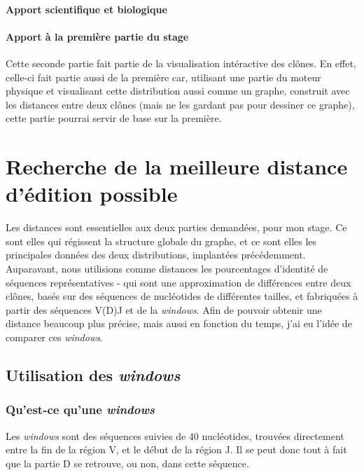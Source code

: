\documentclass[12pt]{report}
\begin{document}
\begin{spacing}{1.2}
\subsubsection{Apport scientifique et biologique}

\subsubsection{Apport à la première partie du stage}

Cette seconde partie fait partie de la visualisation intéractive des clônes.
\newline
En effet, celle-ci fait partie aussi de la première car, utilisant une partie du moteur physique et visualisant cette distribution aussi comme un graphe, construit avec les distances entre deux clônes (mais ne les gardant pas pour dessiner ce graphe), cette partie pourrai servir de base sur la première.

\chapter{Recherche de la meilleure distance d'édition possible}

Les distances sont essentielles aux deux parties demandées, pour mon stage. Ce sont elles qui régissent la structure globale du graphe, et ce sont elles les principales données des deux distributions, implantées précédemment.
\newline
Auparavant, nous utilisions comme distances les pourcentages d'identité de séquences représentatives - qui sont une approximation de différences entre deux clônes, basés sur des séquences de nucléotides de différentes tailles, et fabriquées à partir des séquences V(D)J et de la \textit{windows}.
\newline
Afin de pouvoir obtenir une distance beaucoup plus précise, mais aussi en fonction du temps, j'ai eu l'idée de comparer ces \textit{windows}.

\section{Utilisation des \textit{windows}}

\subsection{Qu'est-ce qu'une \textit{windows}}

Les \textit{windows} sont des séquences suivies de 40 nucléotides, trouvées directement entre la fin de la région V, et le début de la région J. Il se peut donc tout à fait que la partie D se retrouve, ou non, dans cette séquence.


\end{spacing}
\end{document}
